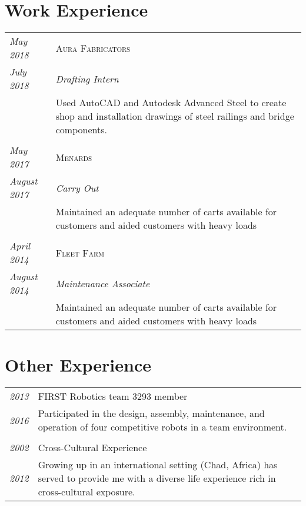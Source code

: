 \documentclass[letterpaper,10pt]{article}
\begin{document}
\section*{Work Experience}
	\begin{tabular}{R{2cm}|p{14cm}}
	\textsl{May 2018}   & \textsc{Aura Fabricators}\\
	\textsl{July 2018}  & \emph {Drafting Intern}\\
	&\footnotesize{Used AutoCAD and Autodesk Advanced Steel to create shop and installation drawings of steel railings and bridge components.}\\
	\\
	\textsl{May 2017}	  & \textsc{Menards}\\
	\textsl{August 2017}  & \emph{Carry Out}\\
	&\footnotesize{Maintained an adequate number of carts available for customers and aided customers with heavy loads}\\
	\\
	\textsl{April 2014}   & \textsc{Fleet Farm}\\
	\textsl{August 2014}  & \emph {Maintenance Associate}\\
	&\footnotesize{Maintained an adequate number of carts available for customers and aided customers with heavy loads}\\
	\end{tabular}
\section*{Other Experience}
	\begin{tabular}{R{2cm}|p{14cm}}
	\textsl{2013} & FIRST Robotics team 3293 member\\
	\textsl{2016} & \footnotesize{Participated in the design, assembly, maintenance, and operation of four competitive robots in a team environment.}\\
	\\
	\textsl{2002} & Cross-Cultural Experience\\
	\textsl{2012} &\footnotesize{Growing up in an international setting (Chad, Africa) has served to provide me with a diverse life experience rich in cross-cultural exposure.}\\
	\end{tabular}
\end{document}
